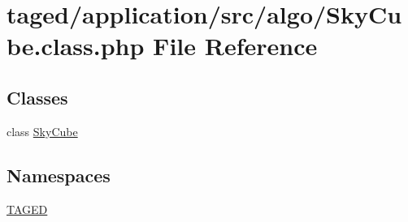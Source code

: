 \hypertarget{_sky_cube_8class_8php}{}\section{taged/application/src/algo/\+Sky\+Cube.class.\+php File Reference}
\label{_sky_cube_8class_8php}
\subsection*{Classes}
\begin{DoxyCompactItemize}
\item 
class \hyperlink{class_sky_cube}{Sky\+Cube}
\end{DoxyCompactItemize}
\subsection*{Namespaces}
\begin{DoxyCompactItemize}
\item 
 \hyperlink{namespace_t_a_g_e_d}{T\+A\+G\+ED}
\end{DoxyCompactItemize}
